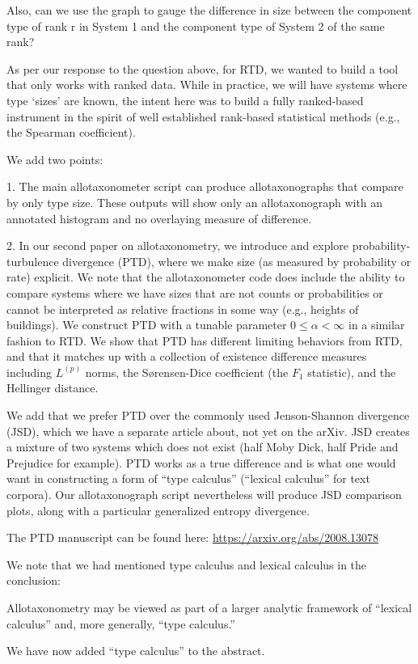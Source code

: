 \begin{reviewercomment}
  Also, can we use the graph to gauge the difference in size
  between the component type of rank r in System 1 and
  the component type of System 2 of the same rank?
\end{reviewercomment}

As per our response to the question above,
for RTD, we wanted to build a tool that only works with ranked data.
While in practice, we will have systems where type `sizes' are known, the intent here
was to build a fully ranked-based instrument in the spirit of well established
rank-based statistical methods (e.g., the Spearman coefficient).

We add two points:

1. The main allotaxonometer script can produce allotaxonographs that
compare by only type size. These outputs will show only an allotaxonograph
with an annotated histogram and no overlaying measure of difference.

2. In our second paper on allotaxonometry, we introduce and explore
probability-turbulence divergence (PTD),
where we make size (as measured by probability or rate) explicit.
We note that the allotaxonometer code does include the ability to
compare systems where we have sizes that are not counts or
probabilities or cannot be interpreted as relative fractions in some
way (e.g., heights of buildings).
We construct PTD with a tunable parameter $0 \le \alpha < \infty$
in a similar fashion to RTD.
We show that PTD has different
limiting behaviors from RTD,
and that it matches up with a collection of existence
difference measures
including
$L^{(p)}$ norms,
the S{\o}rensen-Dice coefficient
(the $F_1$ statistic),
and 
the Hellinger distance.

We add that we prefer PTD over the commonly used Jenson-Shannon divergence (JSD),
which we have a separate article about, not yet on the arXiv.
JSD creates a mixture of two systems which does not exist
(half Moby Dick, half Pride and Prejudice for example).
PTD works as a true difference and is what one would want
in constructing a form of ``type calculus'' (``lexical calculus'' for text corpora).
Our allotaxonograph script nevertheless will produce JSD comparison plots,
along with a particular generalized entropy divergence.

The PTD manuscript can be found here: \url{https://arxiv.org/abs/2008.13078}

We note that we had mentioned type calculus and lexical calculus in the conclusion:
\begin{excerpt}
  Allotaxonometry may be viewed as part of a larger analytic
  framework of ``lexical calculus'' and, more generally, ``type calculus.''
\end{excerpt}
We have now added ``type calculus'' to the abstract.


